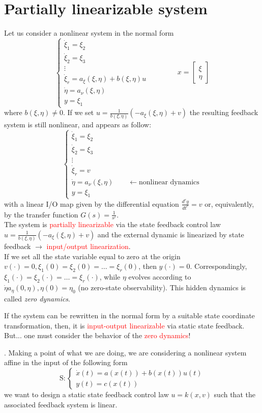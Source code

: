 \section{Partially linearizable system}
Let us consider a nonlinear system in the normal form
\[
\begin{cases}
	\dot{\xi}_1=\xi_2\\
	\dot{\xi}_2=\xi_3\\
	\vdots\\
	\dot{\xi}_r=a_{\xi}(\xi,\eta)+b(\xi,\eta)u\\
	\dot{\eta}=a_{\nu}(\xi,\eta)\\
	y=\xi_1
\end{cases}
\qquad \qquad
x=\begin{bmatrix}
	\xi\\\eta
\end{bmatrix}
\] where $b(\xi,\eta)\neq0$. If we set $u=\frac{1}{b(\xi,\eta)}(-a_{\xi}(\xi,\eta)+v)$ the resulting feedback system is still nonlinear, and appears as follow:
\[
\begin{cases}
	\dot{\xi}_1=\xi_2\\
	\dot{\xi}_2=\xi_3\\
	\vdots\\
	\dot{\xi}_r=v\\
	\boxed{\dot{\eta}=a_{\nu}(\xi,\eta)}\qquad \leftarrow\text{nonlinear dynamics}\\
	y=\xi_1
\end{cases}
\] with a linear I/O map given by the differential equation $\frac{d^ry}{dt^r}=v$ or, equivalently, by the transfer function $G(s)=\frac{1}{s^r}$.\\The system is \textcolor{red}{partially linearizable} via the state feedback control law  $u=\frac{1}{b(\xi,\eta)}(-a_{\xi}(\xi,\eta)+v)$ and the external dynamic is linearized by state feedback $\rightarrow$ \textcolor{red}{input/output linearization}.\\If we set all the state variable equal to zero at the origin $v(\cdot)=0, \xi_1(0)=\xi_2(0)=\dots=\xi_r(0)$, then $y(\cdot)=0$. Correspondingly, $\xi_1(\cdot)=\xi_2(\cdot)=\dots=\xi_r(\cdot)$, while $\eta$ evolves according to $\dot{\eta}a_{\eta}(0,\eta),\eta(0)=\eta_0$ (no zero-state observability). This hidden dynamics is called \emph{zero dynamics}.
\begin{tcolorbox}[colframe=red!50!white, arc=0mm, colback=white]
If the system can be rewritten in the normal form by a suitable state coordinate transformation, then, it is \textcolor{red}{input-output linearizable} via static state feedback.
But... one must consider the behavior of the \textcolor{red}{zero dynamics}!
\end{tcolorbox}. Making a point of what we are doing, we are considering a nonlinear system affine in the input of the following form \[\text{S}: \begin{cases}
\dot{x}(t)=a(x(t))+b(x(t))u(t)\\
y(t)=c(x(t))
\end{cases}
\] we want to design a static state feedback control law $u=k(x,v)$ such that the associated feedback system is linear.
